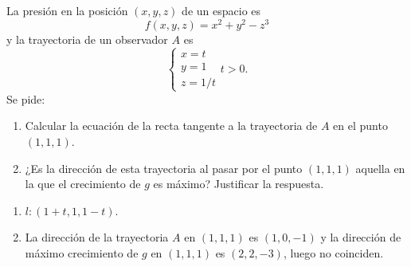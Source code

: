 
{La presión en la posición $(x,y,z)$ de un espacio es 
\[
f(x,y,z)= x^2+y^2-z^3
\]
y la trayectoria de un observador $A$ es 
\[
\begin{cases}
x=t\\
y=1\\
z=1/t
\end{cases}
t>0.
\]
Se pide:
\begin{enumerate}
\item Calcular la ecuación de la recta tangente a la trayectoria de $A$ en el punto $(1,1,1)$.
\item ¿Es la dirección de esta trayectoria al pasar por el punto $(1,1,1)$ aquella en la que el crecimiento de $g$
es máximo? 
Justificar la respuesta. 
\end{enumerate}
}
{\begin{enumerate}
\item $l:(1+t,1,1-t)$.
\item La dirección de la trayectoria $A$ en $(1,1,1)$ es $(1,0,-1)$ y la dirección de máximo crecimiento de $g$ en
$(1,1,1)$ es $(2,2,-3)$, luego no coinciden. 
\end{enumerate}
}
{
}
